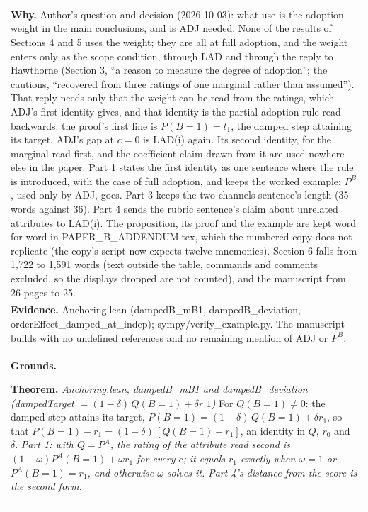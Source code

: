 \documentclass[10pt]{article}
\theoremstyle{definition}
\newlength{\fullw}\setlength{\fullw}{25.9cm}
\begin{document}
{\begin{longtable}{|p{0.9cm}|p{12.2cm}|p{12.2cm}|}
\multicolumn{3}{|p{\fullw}|}{\textbf{Why.} Author's question and decision (2026-10-03): what use is the adoption weight in the main conclusions, and is ADJ needed. None of the results of Sections 4 and 5 uses the weight; they are all at full adoption, and the weight enters only as the scope condition, through LAD and through the reply to Hawthorne (Section 3, ``a reason to measure the degree of adoption''; the cautions, ``recovered from three ratings of one marginal rather than assumed''). That reply needs only that the weight can be read from the ratings, which ADJ's first identity gives, and that identity is the partial-adoption rule read backwards: the proof's first line is $P(B{=}1)=t_1$, the damped step attaining its target. ADJ's gap at $c=0$ is LAD(i) again. Its second identity, for the marginal read first, and the coefficient claim drawn from it are used nowhere else in the paper. Part 1 states the first identity as one sentence where the rule is introduced, with the case of full adoption, and keeps the worked example; $P^{B}$, used only by ADJ, goes. Part 3 keeps the two-channels sentence's length (35 words against 36). Part 4 sends the rubric sentence's claim about unrelated attributes to LAD(i). The proposition, its proof and the example are kept word for word in PAPER\_B\_ADDENDUM.tex, which the numbered copy does not replicate (the copy's script now expects twelve mnemonics). Section 6 falls from 1,722 to 1,591 words (text outside the table, commands and comments excluded, so the displays dropped are not counted), and the manuscript from 26 pages to 25.} \\
\multicolumn{3}{|p{\fullw}|}{\textbf{Evidence.} Anchoring.lean (dampedB\_mB1, dampedB\_deviation, orderEffect\_damped\_at\_indep); sympy/verify\_example.py. The manuscript builds with no undefined references and no remaining mention of ADJ or $P^{B}$.} \\ \hline
\multicolumn{3}{|p{\fullw}|}{\textbf{Grounds.}\par \textbf{Theorem.} \textit{Anchoring.lean, dampedB\_mB1 and dampedB\_deviation (dampedTarget $=(1-\delta)\,Q(B{=}1)+\delta r\_1$)} \newline For $Q(B{=}1)\neq0$: the damped step attains its target,
$P(B{=}1)=(1-\delta)\,Q(B{=}1)+\delta r_1$, so that
$P(B{=}1)-r_1=(1-\delta)\,[Q(B{=}1)-r_1]$, an identity in $Q$, $r_0$ and $\delta$. \newline \textit{Part 1: with $Q=P^{A}$, the rating of the attribute read second is $(1-\omega)P^{A}(B{=}1)+\omega r_1$ for every $c$; it equals $r_1$ exactly when $\omega=1$ or $P^{A}(B{=}1)=r_1$, and otherwise $\omega$ solves it. Part 4's distance from the score is the second form.}} \\

\end{longtable}}
\end{document}
